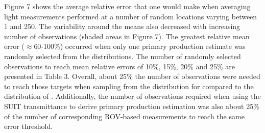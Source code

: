 Figure 7 shows the average relative error that one would make when averaging light measurements performed at a number of random locations varying between 1 and 250. The variability around the means also decreased with increasing number of observations (shaded areas in Figure 7). The greatest relative mean error ($\approx$60-100\%) occurred when only one primary production estimate was randomly selected from the distributions. The number of randomly selected observations to reach mean relative errors of 10\%, 15\%, 20\% and 25\% are presented in Table 3. Overall, about 25\% the number of observations were needed to reach those targets when sampling from the distribution for \ppmixing{} compared to the distribution of \ppunderice{}. Additionally, the number of observations required when using the SUIT transmittance to derive primary production estimation was also about 25\% of the number of corresponding ROV-based measurements to reach the same error threshold.
